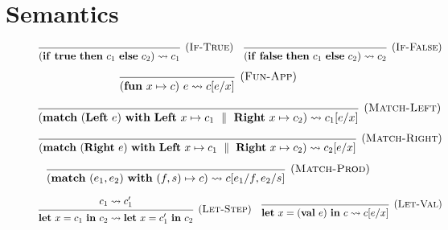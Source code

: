 \documentclass[class=article, crop=false]{standalone}
\begin{document}
\section{Semantics}
\label{sec:full-semantics}
\begin{figure}[H]
    $$
    \begin{prooftree}
    \hypo{}
    \infer1[(\textsc{If-True})]{\left( \effIf \effTrue \effThen c_1 \effElse c_2 \right) \leadsto c_1}
    \end{prooftree}
    \quad
    \begin{prooftree}
      \hypo{}
      \infer1[(\textsc{If-False})]{\left( \effIf \effFalse \effThen c_1 \effElse c_2 \right) \leadsto c_2}
    \end{prooftree}
    $$
    
    $$
    \begin{prooftree}
      \hypo{}
      \infer1[(\textsc{Fun-App})]{(\effFun x \mapsto c)\ e \leadsto c[e/x]}
    \end{prooftree}
    $$

    $$
    \begin{prooftree}
      \hypo{}
      \infer1[(\textsc{Match-Left})]{\left( \effMatch (\effLeft e)\ \effWith \effLeft x \mapsto c_1 \dmid \effRight x \mapsto c_2 \right)  \leadsto c_1[e/x]}
    \end{prooftree}
    $$
    
    $$
    \begin{prooftree}
      \hypo{}
      \infer1[(\textsc{Match-Right})]{\left( \effMatch (\effRight e)\ \effWith \effLeft x \mapsto c_1 \dmid \effRight x \mapsto c_2 \right)  \leadsto c_2[e/x]}
    \end{prooftree}
    $$
    
    $$
    \begin{prooftree}
      \hypo{}
      \infer1[(\textsc{Match-Prod})]{\left( \effMatch (e_1, e_2)\ \effWith (f,s) \mapsto c \right) \leadsto c[e_1/f, e_2/s]}
    \end{prooftree}
    $$
    
    $$
    \begin{prooftree}
      \hypo{c_1 \leadsto c_1'}
      \infer1[(\textsc{Let-Step})]{\effLet x = c_1 \effIn c_2 \leadsto \effLet x = c_1' \effIn c_2}
    \end{prooftree}
    \quad
    \begin{prooftree}
      \hypo{}
      \infer1[(\textsc{Let-Val})]{\effLet x = (\effVal e) \effIn c \leadsto c[e/x]}
    \end{prooftree}
    $$
    

\end{figure}
\end{document}

